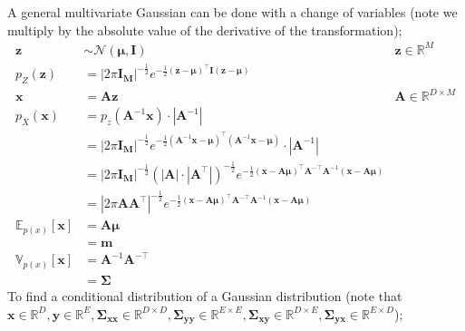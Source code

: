 \documentclass[a4paper, 12pt]{article}
\newcommand{\mat}[1]{\boldsymbol{#1}}
\renewcommand{\vec}[1]{\boldsymbol{#1}}
\newcommand{\mbbr}[0]{\mathbb{R}}
\begin{document}
                A general multivariate Gaussian can be done with a change of variables (note we multiply by the absolute value of the derivative of the transformation);
                \begin{align*}
                    \vec{z} & \sim \mathcal{N}(\vec{\mu}, \mat{I}) & \vec{z} \in \mbbr^M \\
                    p_Z(\vec{z}) & = | 2 \pi \mat{I_M} |^{-\frac{1}{2}} e^{-\frac{1}{2}(\vec{z} - \vec{\mu})^\top\mat{I}(\vec{z} - \vec{\mu})} \\ %
                    \vec{x} & = \mat{A}\vec{z} & \mat{A} \in \mbbr^{D \times M} \\
                    p_X(\vec{x}) & = p_z(\mat{A}^{-1}\vec{x}) \cdot | \mat{A}^{-1} | \\
                    & = | 2 \pi \mat{I_M} |^{-\frac{1}{2}} e^{-\frac{1}{2}(\mat{A}^{-1}\vec{x} - \vec{\mu})^\top(\mat{A}^{-1}\vec{x} - \vec{\mu})} \cdot | \mat{A}^{-1} | \\
                    & = | 2 \pi \mat{I_M} |^{-\frac{1}{2}} (| \mat{A} | \cdot | \mat{A}^\top |)^{-\frac{1}{2}} e^{-\frac{1}{2}(\vec{x} - \mat{A}\vec{\mu})^\top \mat{A}^{-\top}\mat{A}^{-1} (\vec{x} - \mat{A}\vec{\mu})} \\
                    & = | 2 \pi \mat{A}\mat{A}^\top |^{-\frac{1}{2}} e^{-\frac{1}{2}(\vec{x} - \mat{A}\vec{\mu})^\top \mat{A}^{-\top}\mat{A}^{-1} (\vec{x} - \mat{A}\vec{\mu})} \\
                    \mathbb{E}_{p(x)}[\vec{x}] & = \mat{A}\vec{\mu} \\
                    & = \vec{m} \\
                    \mathbb{V}_{p(x)}[\vec{x}] & = \mat{A}^{-1}\mat{A}^{-\top} \\
                    & = \mat{\Sigma}
                \end{align*}
                To find a conditional distribution of a Gaussian distribution (note that $\vec{x} \in \mbbr^D, \vec{y} \in \mbbr^E, \mat{\Sigma_{xx}} \in \mbbr^{D \times D}, \mat{\Sigma_{yy}} \in \mbbr^{E \times E}, \mat{\Sigma_{xy}} \in \mbbr^{D \times E}, \mat{\Sigma_{yx}} \in \mbbr^{E \times D}$);
\end{document}
